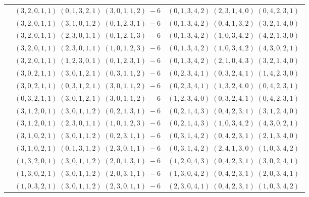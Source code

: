 \documentclass[11pt]{article}
\begin{document}
\begin{longtable}[l]{|c|c|c|}
 \cline{2-3} 
 & $(3 ,2 ,0 ,1 ,1) \;(0 ,1 ,3 ,2 ,1) \;(3 ,0 ,1 ,1 ,2) \;-6$ & $(0 ,1 ,3 ,4 ,2) \;(2 ,3 ,1 ,4 ,0) \;(0 ,4 ,2 ,3 ,1) \;$\\ 
 \cline{2-3} 
 & $(3 ,2 ,0 ,1 ,1) \;(3 ,1 ,0 ,1 ,2) \;(0 ,1 ,2 ,3 ,1) \;-6$ & $(0 ,1 ,3 ,4 ,2) \;(0 ,4 ,1 ,3 ,2) \;(3 ,2 ,1 ,4 ,0) \;$\\ 
 \cline{2-3} 
 & $(3 ,2 ,0 ,1 ,1) \;(2 ,3 ,0 ,1 ,1) \;(0 ,1 ,2 ,1 ,3) \;-6$ & $(0 ,1 ,3 ,4 ,2) \;(1 ,0 ,3 ,4 ,2) \;(4 ,2 ,1 ,3 ,0) \;$\\ 
 \cline{2-3} 
 & $(3 ,2 ,0 ,1 ,1) \;(2 ,3 ,0 ,1 ,1) \;(1 ,0 ,1 ,2 ,3) \;-6$ & $(0 ,1 ,3 ,4 ,2) \;(1 ,0 ,3 ,4 ,2) \;(4 ,3 ,0 ,2 ,1) \;$\\ 
 \cline{2-3} 
 & $(3 ,2 ,0 ,1 ,1) \;(1 ,2 ,3 ,0 ,1) \;(0 ,1 ,2 ,3 ,1) \;-6$ & $(0 ,1 ,3 ,4 ,2) \;(2 ,1 ,0 ,4 ,3) \;(3 ,2 ,1 ,4 ,0) \;$\\ 
 \cline{2-3} 
 & $(3 ,0 ,2 ,1 ,1) \;(3 ,0 ,1 ,2 ,1) \;(0 ,3 ,1 ,1 ,2) \;-6$ & $(0 ,2 ,3 ,4 ,1) \;(0 ,3 ,2 ,4 ,1) \;(1 ,4 ,2 ,3 ,0) \;$\\ 
 \cline{2-3} 
 & $(3 ,0 ,2 ,1 ,1) \;(0 ,3 ,1 ,2 ,1) \;(3 ,0 ,1 ,1 ,2) \;-6$ & $(0 ,2 ,3 ,4 ,1) \;(1 ,3 ,2 ,4 ,0) \;(0 ,4 ,2 ,3 ,1) \;$\\ 
 \cline{2-3} 
 & $(0 ,3 ,2 ,1 ,1) \;(3 ,0 ,1 ,2 ,1) \;(3 ,0 ,1 ,1 ,2) \;-6$ & $(1 ,2 ,3 ,4 ,0) \;(0 ,3 ,2 ,4 ,1) \;(0 ,4 ,2 ,3 ,1) \;$\\ 
 \cline{2-3} 
 & $(3 ,1 ,2 ,0 ,1) \;(3 ,0 ,1 ,1 ,2) \;(0 ,2 ,1 ,3 ,1) \;-6$ & $(0 ,2 ,1 ,4 ,3) \;(0 ,4 ,2 ,3 ,1) \;(3 ,1 ,2 ,4 ,0) \;$\\ 
 \cline{2-3} 
 & $(3 ,1 ,2 ,0 ,1) \;(2 ,3 ,0 ,1 ,1) \;(1 ,0 ,1 ,2 ,3) \;-6$ & $(0 ,2 ,1 ,4 ,3) \;(1 ,0 ,3 ,4 ,2) \;(4 ,3 ,0 ,2 ,1) \;$\\ 
 \cline{2-3} 
 & $(3 ,1 ,0 ,2 ,1) \;(3 ,0 ,1 ,1 ,2) \;(0 ,2 ,3 ,1 ,1) \;-6$ & $(0 ,3 ,1 ,4 ,2) \;(0 ,4 ,2 ,3 ,1) \;(2 ,1 ,3 ,4 ,0) \;$\\ 
 \cline{2-3} 
 & $(3 ,1 ,0 ,2 ,1) \;(0 ,1 ,3 ,1 ,2) \;(2 ,3 ,0 ,1 ,1) \;-6$ & $(0 ,3 ,1 ,4 ,2) \;(2 ,4 ,1 ,3 ,0) \;(1 ,0 ,3 ,4 ,2) \;$\\ 
 \cline{2-3} 
 & $(1 ,3 ,2 ,0 ,1) \;(3 ,0 ,1 ,1 ,2) \;(2 ,0 ,1 ,3 ,1) \;-6$ & $(1 ,2 ,0 ,4 ,3) \;(0 ,4 ,2 ,3 ,1) \;(3 ,0 ,2 ,4 ,1) \;$\\ 
 \cline{2-3} 
 & $(1 ,3 ,0 ,2 ,1) \;(3 ,0 ,1 ,1 ,2) \;(2 ,0 ,3 ,1 ,1) \;-6$ & $(1 ,3 ,0 ,4 ,2) \;(0 ,4 ,2 ,3 ,1) \;(2 ,0 ,3 ,4 ,1) \;$\\ 
 \cline{2-3} 
 & $(1 ,0 ,3 ,2 ,1) \;(3 ,0 ,1 ,1 ,2) \;(2 ,3 ,0 ,1 ,1) \;-6$ & $(2 ,3 ,0 ,4 ,1) \;(0 ,4 ,2 ,3 ,1) \;(1 ,0 ,3 ,4 ,2) \;$\\ 

\end{longtable}
\end{document}
